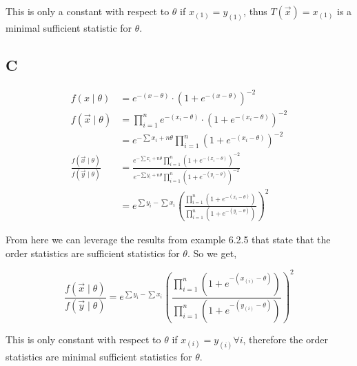 This is only a constant with respect to $\theta$ if $x_{(1)} = y_{(1)}$, thus $T(\vec{x}) = x_{(1)}$ is a minimal sufficient statistic for $\theta$.

\pagebreak

\subsection*{C}

\begin{align*}
	f(x \mid \theta) &= e^{-(x-\theta)} \cdot (1+e^{-(x-\theta)})^{-2} \\
	f(\vec{x} \mid \theta) &= \prod_{i=1}^n  e^{-(x_i-\theta)} \cdot (1+e^{-(x_i-\theta)})^{-2} \\
	&= e^{-\sum x_i + n\theta} \prod_{i=1}^n (1+e^{-(x_i-\theta)})^{-2} \\
	\frac{f(\vec{x} \mid \theta)}{f(\vec{y} \mid \theta)} &= \frac{ e^{-\sum x_i + n\theta} \prod_{i=1}^n (1+e^{-(x_i-\theta)})^{-2}}{ e^{-\sum y_i + n\theta} \prod_{i=1}^n (1+e^{-(y_i-\theta)})^{-2}} \\
	&= e^{\sum y_i - \sum x_i} \left( \frac{ \prod_{i=1}^n (1+e^{-(x_i-\theta)})}{ \prod_{i=1}^n (1+e^{-(y_i-\theta)})}  \right)^2
\end{align*}

From here we can leverage the results from example 6.2.5 that state that the order statistics are sufficient statistics for $\theta$. So we get,

\[
	\frac{f(\vec{x} \mid \theta)}{f(\vec{y} \mid \theta)} =  e^{\sum y_i - \sum x_i} \left( \frac{ \prod_{i=1}^n (1+e^{-(x_{(i)}-\theta)})}{ \prod_{i=1}^n (1+e^{-(y_{(i)}-\theta)})}\right)^2
\]

This is only constant with respect to $\theta$ if $x_{(i)} = y_{(i)} \forall i$, therefore the order statistics are minimal sufficient statistics for $\theta$.
